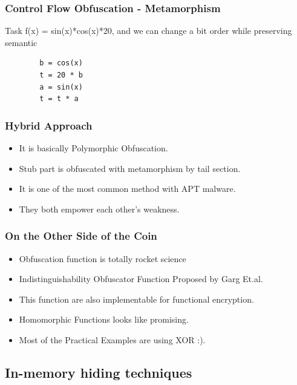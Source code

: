 \documentclass{beamer}
\begin{document}

\begin{frame} 
\frametitle{Control Flow Obfuscation - Metamorphism}
Task f(x) = sin(x)*cos(x)*20, and we can change a bit order while preserving semantic
\begin{example}
	\begin{verbatim}
		b = cos(x)
		t = 20 * b
		a = sin(x)
		t = t * a\end{verbatim}
	\end{example}
\end{frame}


\begin{frame} %
\frametitle{Hybrid Approach}
\begin{itemize}
	\item It is basically Polymorphic Obfuscation.
	\item Stub part is obfuscated with metamorphism by tail section.
	\item It is one of the most common method with APT malware.
	\item They both empower each other's weakness.
\end{itemize}
\end{frame}

\begin{frame} %
\frametitle{On the Other Side of the Coin}
\begin{itemize}
	\item Obfuscation function is totally rocket science
	\item Indistinguishability Obfuscator Function Proposed by Garg Et.al.
	\item This function are also implementable for functional encryption.
	\item Homomorphic Functions looks like promising.
	\item Most of the Practical Examples are using XOR :).
\end{itemize}
\end{frame}

\subsection{In-memory hiding techniques}
\end{document}
